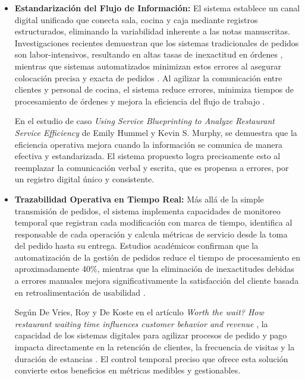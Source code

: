 \begin{itemize}
	\item \textbf{Estandarización del Flujo de Información:}   
	El sistema establece un canal digital unificado que conecta sala, cocina y caja mediante registros estructurados, eliminando la variabilidad inherente a las notas manuscritas. Investigaciones recientes demuestran que los sistemas tradicionales de pedidos son labor-intensivos, resultando en altas tasas de inexactitud en órdenes \cite{Sultana2024}, mientras que sistemas automatizados minimizan estos errores al asegurar colocación precisa y exacta de pedidos \cite{Sultana2024}. Al agilizar la comunicación entre clientes y personal de cocina, el sistema reduce errores, minimiza tiempos de procesamiento de órdenes y mejora la eficiencia del flujo de trabajo \cite{Katagri2025}.
	
	En el estudio de caso \textit{Using Service Blueprinting to Analyze Restaurant Service Efficiency} de Emily Hummel y Kevin S. Murphy\cite{EmilyHummel}, se demuestra que la eficiencia operativa mejora cuando la información se comunica de manera efectiva y estandarizada. El sistema propuesto logra precisamente esto al reemplazar la comunicación verbal y escrita, que es propensa a errores, por un registro digital único y consistente.
	
	
	\item \textbf{Trazabilidad Operativa en Tiempo Real:} 
	Más allá de la simple transmisión de pedidos, el sistema implementa capacidades de monitoreo temporal que registran cada modificación con marca de tiempo, identifica al responsable de cada operación y calcula métricas de servicio desde la toma del pedido hasta su entrega. Estudios académicos confirman que la automatización de la gestión de pedidos reduce el tiempo de procesamiento en aproximadamente 40\%, mientras que la eliminación de inexactitudes debidas a errores manuales mejora significativamente la satisfacción del cliente basada en retroalimentación de usabilidad \cite{Katagri2025}.
	
	Según De Vries, Roy y De Koste en el artículo \textit{Worth the wait? How restaurant waiting time influences customer behavior and revenue} \cite{DEVRIES201859}, la capacidad de los sistemas digitales para agilizar procesos de pedido y pago impacta directamente en la retención de clientes, la frecuencia de visitas y la duración de estancias \cite{DEVRIES201859}. El control temporal preciso que ofrece esta solución convierte estos beneficios en métricas medibles y gestionables.
	

\end{itemize}
